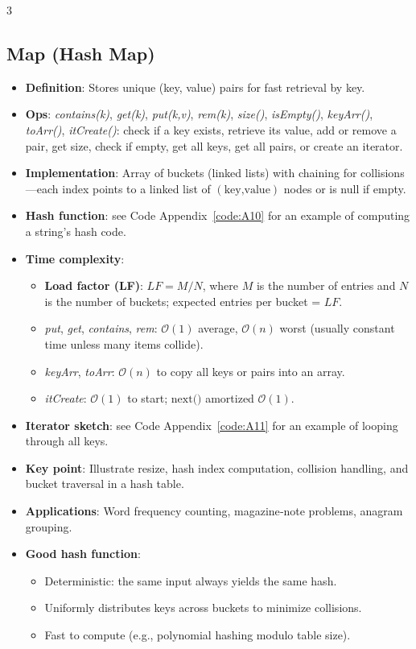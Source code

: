 \documentclass[6pt,landscape]{article}
\newcommand{\bigO}[1]{\ensuremath{\mathcal{O}(#1)}}
\newcommand{\keyword}[1]{\textbf{\textcolor{keywordcolor}{#1}}}
\newcommand{\op}[1]{\textit{\textcolor{opcolor}{#1}}}
\begin{document}
\begin{multicols}{3}
\subsection{Map (Hash Map)}\label{sec:map}
\begin{itemize}
  \item \keyword{Definition}: Stores unique (key, value) pairs for fast retrieval by key.
  \item \textbf{Ops}: \op{contains(k)}, \op{get(k)}, \op{put(k,v)}, \op{rem(k)}, \op{size()}, \op{isEmpty()}, \op{keyArr()}, \op{toArr()}, \op{itCreate()}: check if a key exists, retrieve its value, add or remove a pair, get size, check if empty, get all keys, get all pairs, or create an iterator.
  \item \textbf{Implementation}: Array of buckets (linked lists) with chaining for collisions—each index points to a linked list of \((\text{key,value})\) nodes or is null if empty.
  \item \textbf{Hash function}: see Code Appendix~\ref{code:A10} for an example of computing a string’s hash code.
  \item \textbf{Time complexity}:
    \begin{itemize}
      \item \keyword{Load factor (LF)}: \(\mathit{LF} = M / N\), where \(M\) is the number of entries and \(N\) is the number of buckets; expected entries per bucket = \(\mathit{LF}\).
      \item \op{put}, \op{get}, \op{contains}, \op{rem}: \bigO{1} average, \bigO{n} worst (usually constant time unless many items collide).
      \item \op{keyArr}, \op{toArr}: \bigO{n} to copy all keys or pairs into an array.
      \item \op{itCreate}: \bigO{1} to start; \(\text{next()}\) amortized \bigO{1}.
    \end{itemize}
  \item \textbf{Iterator sketch}: see Code Appendix~\ref{code:A11} for an example of looping through all keys.
  \item \textbf{Key point}: Illustrate resize, hash index computation, collision handling, and bucket traversal in a hash table.
  \item \textbf{Applications}: Word frequency counting, magazine‐note problems, anagram grouping.
  \item \keyword{Good hash function}:
    \begin{itemize}
      \item Deterministic: the same input always yields the same hash.
      \item Uniformly distributes keys across buckets to minimize collisions.
      \item Fast to compute (e.g., polynomial hashing modulo table size).
    \end{itemize}
\end{itemize}


\end{multicols}
\end{document}
